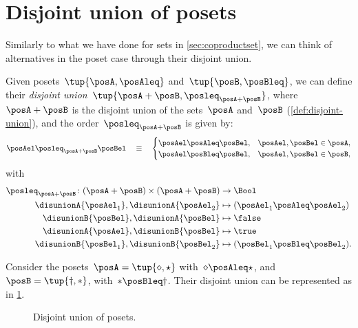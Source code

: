 
\section{Disjoint union of posets}

Similarly to what we have done for sets in \cref{sec:coproductset}, we can think of alternatives in the poset case through their disjoint union.

\begin{definition}
  Given posets~$\tup{\posA, \posAleq}$ and~$\tup{\posB, \posBleq}$, we can define their \emph{disjoint union}~$\tup{\posA + \posB, \posleq_{\posA + \posB}}$, where~$\posA + \posB$
  is the disjoint union of the sets~$\posA$ and~$\posB$ (\cref{def:disjoint-union}), and the
  order~$\posleq_{\posA + \posB}$ is given by:
  \begin{equation}
    \posAel \posleq_{\posA + \posB} \posBel \quad\equiv\quad
    \begin{cases}
      \posAel \posAleq \posBel, & \posAel,\posBel \in \posA, \\
      \posAel \posBleq \posBel, & \posAel,\posBel \in \posB,
    \end{cases}
  \end{equation}
  with
  \begin{equation}
    \begin{aligned}
      \posleq_{\posA+\posB}\colon (\posA+\posB)\times (\posA+\posB)&\to \Bool\\
      \disunionA{\posAel_1},\disunionA{\posAel_2}&\mapsto (\posAel_1\posAleq \posAel_2)\\
      \disunionB{\posBel},\disunionA{\posBel}&\mapsto \false\\
      \disunionA{\posAel},\disunionB{\posBel}&\mapsto \true\\
      \disunionB{\posBel_1},\disunionB{\posBel_2}&\mapsto (\posBel_1\posBleq \posBel_2).
    \end{aligned}
  \end{equation}
\end{definition}


\begin{example}
  Consider the posets~$\posA=\tup{\diamond, \star}$ with~$\diamond \posAleq \star$, and~$\posB=\tup{\dagger,\ast}$, with~$\ast \posBleq \dagger$. Their disjoint union can be represented as in \cref{fig:poset-coproduct}.

  \begin{figure}[h!]
    \centering
    \caption{Disjoint union of posets.}
    \label{fig:poset-coproduct}
  \end{figure}
\end{example}

